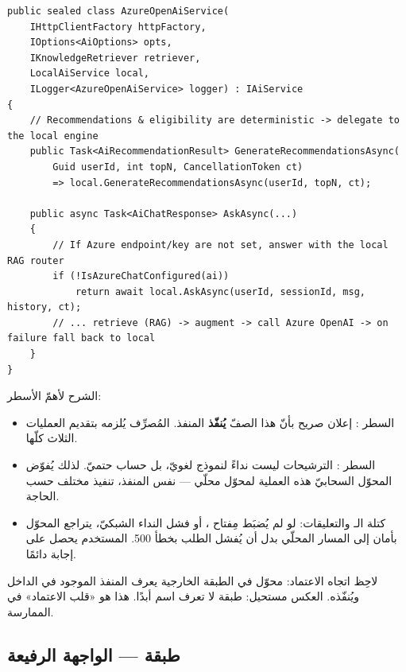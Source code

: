 \begin{english}
\begin{lstlisting}[language={[Sharp]C}]
public sealed class AzureOpenAiService(
    IHttpClientFactory httpFactory,
    IOptions<AiOptions> opts,
    IKnowledgeRetriever retriever,
    LocalAiService local,
    ILogger<AzureOpenAiService> logger) : IAiService
{
    // Recommendations & eligibility are deterministic -> delegate to the local engine
    public Task<AiRecommendationResult> GenerateRecommendationsAsync(
        Guid userId, int topN, CancellationToken ct)
        => local.GenerateRecommendationsAsync(userId, topN, ct);

    public async Task<AiChatResponse> AskAsync(...)
    {
        // If Azure endpoint/key are not set, answer with the local RAG router
        if (!IsAzureChatConfigured(ai))
            return await local.AskAsync(userId, sessionId, msg, history, ct);
        // ... retrieve (RAG) -> augment -> call Azure OpenAI -> on failure fall back to local
    }
}
\end{lstlisting}
\end{english}

الشرح لأهمّ الأسطر:
\begin{itemize}
\item السطر : إعلان صريح بأنّ هذا الصفّ \textbf{يُنفّذ}
  المنفذ. المُصرِّف يُلزمه بتقديم العمليات الثلاث كلّها.
\item السطر : الترشيحات ليست نداءً
  لنموذج لغويّ، بل حساب حتميّ. لذلك يُفوّض المحوّل السحابيّ هذه العملية لمحوّل محلّي
   — نفس المنفذ، تنفيذ مختلف حسب الحاجة.
\item كتلة الـ  والتعليقات: لو لم يُضبَط مِفتاح ، أو فشل النداء
  الشبكيّ، يتراجع المحوّل بأمان إلى المسار المحلّي بدل أن يُفشل الطلب بخطأ 500.
  المستخدم يحصل على إجابة دائمًا.
\end{itemize}

\begin{note}
لاحِظ اتجاه الاعتماد: محوّل  في الطبقة الخارجية يعرف
المنفذ  الموجود في الداخل ويُنفّذه. العكس مستحيل: طبقة
 لا تعرف اسم  أبدًا. هذا هو «قلب الاعتماد»
 في الممارسة.
\end{note}

\subsection{طبقة  — الواجهة الرفيعة}

